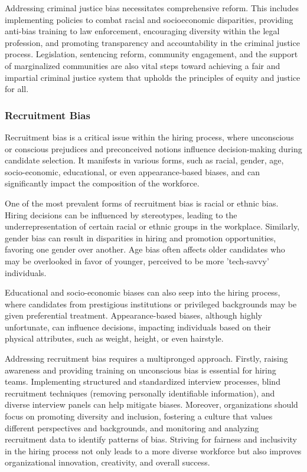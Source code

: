 \documentclass[12pt,a4paper,openright,twoside]{book}
\begin{document}
Addressing criminal justice bias necessitates comprehensive reform. This includes implementing policies to combat racial and socioeconomic disparities, providing anti-bias training to law enforcement, encouraging diversity within the legal profession, and promoting transparency and accountability in the criminal justice process. Legislation, sentencing reform, community engagement, and the support of marginalized communities are also vital steps toward achieving a fair and impartial criminal justice system that upholds the principles of equity and justice for all.


\subsubsection{Recruitment Bias}
Recruitment bias is a critical issue within the hiring process, where unconscious or conscious prejudices and preconceived notions influence decision-making during candidate selection. It manifests in various forms, such as racial, gender, age, socio-economic, educational, or even appearance-based biases, and can significantly impact the composition of the workforce. \cite{mujtaba2019ethical} 

One of the most prevalent forms of recruitment bias is racial or ethnic bias. Hiring decisions can be influenced by stereotypes, leading to the underrepresentation of certain racial or ethnic groups in the workplace. Similarly, gender bias can result in disparities in hiring and promotion opportunities, favoring one gender over another. Age bias often affects older candidates who may be overlooked in favor of younger, perceived to be more 'tech-savvy' individuals. 

Educational and socio-economic biases can also seep into the hiring process, where candidates from prestigious institutions or privileged backgrounds may be given preferential treatment. Appearance-based biases, although highly unfortunate, can influence decisions, impacting individuals based on their physical attributes, such as weight, height, or even hairstyle. 

Addressing recruitment bias requires a multipronged approach. Firstly, raising awareness and providing training on unconscious bias is essential for hiring teams. Implementing structured and standardized interview processes, blind recruitment techniques (removing personally identifiable information), and diverse interview panels can help mitigate biases. Moreover, organizations should focus on promoting diversity and inclusion, fostering a culture that values different perspectives and backgrounds, and monitoring and analyzing recruitment data to identify patterns of bias. Striving for fairness and inclusivity in the hiring process not only leads to a more diverse workforce but also improves organizational innovation, creativity, and overall success.
\newpage
\end{document}
